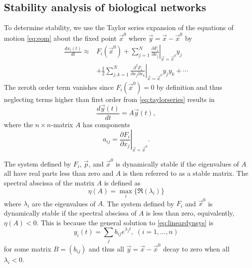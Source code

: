 \subsection{Stability analysis of biological networks}
To determine stability, we use the Taylor series expansion of the equations of motion \ref{eq:eom} about the fixed point $\vec{x}^0$ where $\vec{y} = \vec{x} - \vec{x}^0$ by
\begin{equation}\label{eq:taylorseries}
\begin{aligned}
\frac{dx_i(t)}{dt} \approx & F_i(\vec{x}^0)
+ \sum_{j=1}^{N} \left. \frac{\partial F_i}{\partial x_j} \right|_{\vec{x} = \vec{x}^0} y_j\\
& + \frac{1}{2}\sum_{j,k=1}^{N} \left. \frac{\partial^2 F_i}{\partial x_j \partial x_k} \right|_{\vec{x} = \vec{x}^0} y_j y_k + \cdots
\end{aligned}
\end{equation}
The zeroth order term vanishes since $F_i(\vec{x}^0)=0$ by definition and thus neglecting terms higher than first order from \ref{eq:taylorseries} results in
\begin{equation}\label{eq:lineardynsys}
\frac{d\vec{y}(t)}{dt} = A \vec{y}(t),
\end{equation}
where the $n \times n$-matrix $A$ has components
$$
a_{ij} = \left. \frac{\partial F_i}{\partial x_j} \right|_{\vec{x} = \vec{x}^0}.
$$

The system defined by $F_i$, $\vec{p}$, and $\vec{x}^0$ is dynamically stable if the eigenvalues of $A$ all have real parts less than zero and $A$ is then referred to as a stable matrix. The spectral abscissa of the matrix $A$ is defined as
$$
\eta(A) = \max_i \{\Re(\lambda_i)\}
$$
where $\lambda_i$ are the eigenvalues of $A$. The system defined by $F_i$ and $\vec{x}^0$ is dynamically stable if the spectral abscissa of $A$ is less than zero, equivalently, $\eta(A) < 0$. This is because the general solution to \ref{eq:lineardynsys} is
$$
y_i(t) = \sum_j b_{ij} e^{\lambda_j t}, \; (i=1,\ldots,n)
$$
for some matrix $B=(b_{ij})$ and thus all $\vec{y} = \vec{x} - \vec{x}^0$ decay to zero when all $\lambda_i < 0$.

